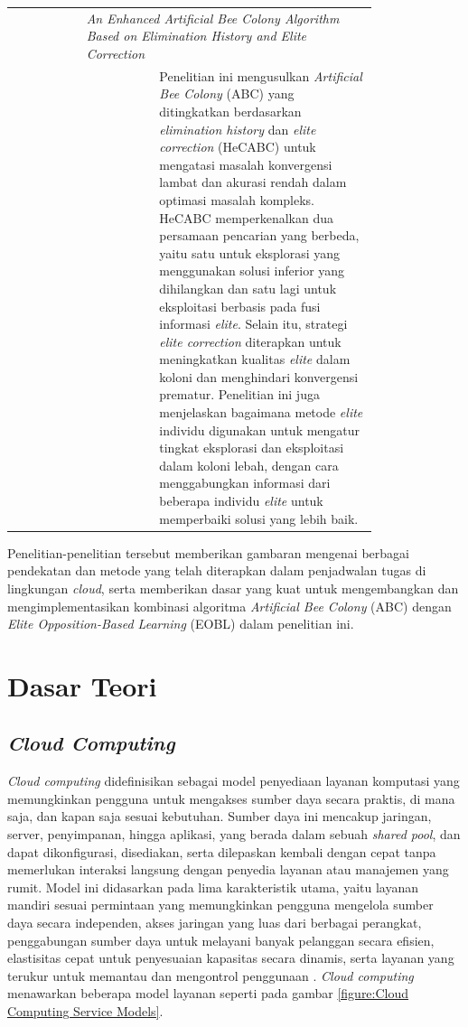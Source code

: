 \begin{longtable}{|c|m{0.2\linewidth}|m{0.6\linewidth}|}
    \pagebreak
    \multirow{2}{*}{7} & \multicolumn{2}{|p{\dimexpr0.9\linewidth}|}{\textit{An Enhanced Artificial Bee Colony Algorithm Based on Elimination History and Elite Correction}} \\ \cline{2-3}
                   & \multicolumn{1}{c|}{\parencite{Lei2024}} & Penelitian ini mengusulkan \textit{Artificial Bee Colony} (ABC) yang ditingkatkan berdasarkan \textit{elimination history} dan \textit{elite correction} (HeCABC) untuk mengatasi masalah konvergensi lambat dan akurasi rendah dalam optimasi masalah kompleks. HeCABC memperkenalkan dua persamaan pencarian yang berbeda, yaitu satu untuk eksplorasi yang menggunakan solusi inferior yang dihilangkan dan satu lagi untuk eksploitasi berbasis pada fusi informasi \textit{elite}. Selain itu, strategi \textit{elite correction} diterapkan untuk meningkatkan kualitas \textit{elite} dalam koloni dan menghindari konvergensi prematur. Penelitian ini juga menjelaskan bagaimana metode \textit{elite} individu digunakan untuk mengatur tingkat eksplorasi dan eksploitasi dalam koloni lebah, dengan cara menggabungkan informasi dari beberapa individu \textit{elite} untuk memperbaiki solusi yang lebih baik. \\ \hline
\end{longtable}

Penelitian-penelitian tersebut memberikan gambaran mengenai berbagai pendekatan dan metode yang telah diterapkan dalam penjadwalan tugas di lingkungan \textit{cloud}, serta memberikan dasar yang kuat untuk mengembangkan dan mengimplementasikan kombinasi algoritma \textit{Artificial Bee Colony} (ABC) dengan\textit{ Elite Opposition-Based Learning} (EOBL) dalam penelitian ini.

\section{Dasar Teori}
\subsection{\textit{Cloud Computing}}
\textit{Cloud computing} didefinisikan sebagai model penyediaan layanan komputasi yang memungkinkan pengguna untuk mengakses sumber daya secara praktis, di mana saja, dan kapan saja sesuai kebutuhan. Sumber daya ini mencakup jaringan, server, penyimpanan, hingga aplikasi, yang berada dalam sebuah \textit{shared pool}, dan dapat dikonfigurasi, disediakan, serta dilepaskan kembali dengan cepat tanpa memerlukan interaksi langsung dengan penyedia layanan atau manajemen yang rumit. Model ini didasarkan pada lima karakteristik utama, yaitu layanan mandiri sesuai permintaan yang memungkinkan pengguna mengelola sumber daya secara independen, akses jaringan yang luas dari berbagai perangkat, penggabungan sumber daya untuk melayani banyak pelanggan secara efisien, elastisitas cepat untuk penyesuaian kapasitas secara dinamis, serta layanan yang terukur untuk memantau dan mengontrol penggunaan \parencite{Marinescu2017}. \textit{Cloud computing} menawarkan beberapa model layanan seperti pada gambar \ref{figure:Cloud Computing Service Models}.

